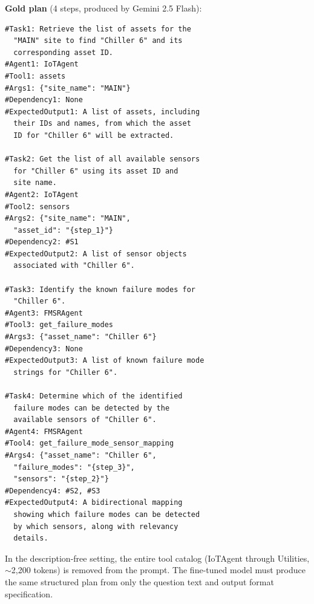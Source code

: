 \documentclass[conference]{IEEEtran}
\begin{document}
\vspace{0.5em}
\textbf{Gold plan} (4 steps, produced by Gemini 2.5 Flash):

\begin{lstlisting}
#Task1: Retrieve the list of assets for the
  "MAIN" site to find "Chiller 6" and its
  corresponding asset ID.
#Agent1: IoTAgent
#Tool1: assets
#Args1: {"site_name": "MAIN"}
#Dependency1: None
#ExpectedOutput1: A list of assets, including
  their IDs and names, from which the asset
  ID for "Chiller 6" will be extracted.

#Task2: Get the list of all available sensors
  for "Chiller 6" using its asset ID and
  site name.
#Agent2: IoTAgent
#Tool2: sensors
#Args2: {"site_name": "MAIN",
  "asset_id": "{step_1}"}
#Dependency2: #S1
#ExpectedOutput2: A list of sensor objects
  associated with "Chiller 6".

#Task3: Identify the known failure modes for
  "Chiller 6".
#Agent3: FMSRAgent
#Tool3: get_failure_modes
#Args3: {"asset_name": "Chiller 6"}
#Dependency3: None
#ExpectedOutput3: A list of known failure mode
  strings for "Chiller 6".

#Task4: Determine which of the identified
  failure modes can be detected by the
  available sensors of "Chiller 6".
#Agent4: FMSRAgent
#Tool4: get_failure_mode_sensor_mapping
#Args4: {"asset_name": "Chiller 6",
  "failure_modes": "{step_3}",
  "sensors": "{step_2}"}
#Dependency4: #S2, #S3
#ExpectedOutput4: A bidirectional mapping
  showing which failure modes can be detected
  by which sensors, along with relevancy
  details.
\end{lstlisting}

In the description-free setting, the entire tool catalog (IoTAgent through Utilities, $\sim$2,200 tokens) is removed from the prompt. The fine-tuned model must produce the same structured plan from only the question text and output format specification.

\FloatBarrier
\end{document}
